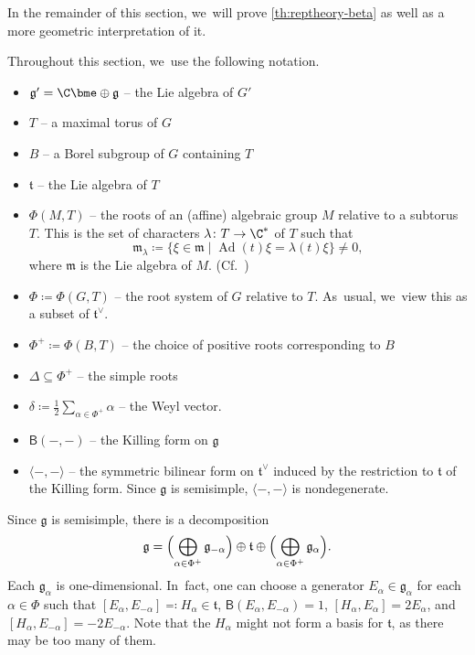 In the remainder of this section, we~will prove \cref{th:reptheory-beta} as well as a more geometric interpretation of it.

\begin{notation}
Throughout this section, we~use the following notation.

\begin{itemize}
\item $\mathfrak{g}'=\C\bme\oplus \mathfrak{g}$ -- the Lie algebra of $G'$
\item $T$ -- a maximal torus of $G$
\item $B$ -- a Borel subgroup of $G$ containing $T$
\item $\mathfrak{t}$ -- the Lie algebra of $T$

\item $\Phi(M,T)$ -- the roots of an (affine) algebraic group $M$ relative to a subtorus $T$. This is the set of characters $\lambda\colon T\to \C^*$ of $T$ such that
\[
\mathfrak{m}_\lambda \coloneqq \{\xi\in \mathfrak{m} \mid \operatorname{Ad}(t)\xi = \lambda(t)\xi\}\neq 0,
\]
where $\mathfrak{m}$ is the Lie algebra of $M$. (Cf.~\cite{Hum75})

\item $\Phi\coloneqq \Phi(G,T)$ -- the root system of $G$ relative to $T$. As~usual, we~view this as a subset of $\mathfrak{t}^\vee$.

\item $\Phi^+\coloneqq \Phi(B,T)$ -- the choice of positive roots corresponding to $B$

\item $\Delta\subseteq \Phi^+$ -- the simple roots

\item $\delta \coloneqq \displaystyle\frac{1}{2}\sum_{\alpha\in \Phi^+}\alpha$ -- the Weyl vector.

\item $\mathsf{B}(-,-)$ -- the Killing form on $\mathfrak{g}$
\item $\langle-,-\rangle$ -- the symmetric bilinear form on $\mathfrak{t}^\vee$ induced by the restriction to $\mathfrak{t}$ of the Killing form. Since $\mathfrak{g}$ is semisimple, $\langle-,-\rangle$ is nondegenerate.
\qedhere
\end{itemize}
\end{notation}

Since $\mathfrak{g}$ is semisimple, there is a decomposition
\[
\mathfrak{g} = \Bigl(\bigoplus_{\alpha\in \Phi^+} \mathfrak{g}_{-\alpha}\Bigr)\oplus \mathfrak{t}\oplus \Bigl(\bigoplus_{\alpha\in \Phi^+} \mathfrak{g}_\alpha\Bigr).
\]
Each $\mathfrak{g}_\alpha$ is one-dimensional. In~fact, one can choose a generator $E_\alpha\in \mathfrak{g}_\alpha$ for each $\alpha\in \Phi$ such that $[E_\alpha,E_{-\alpha}]\eqqcolon H_\alpha\in \mathfrak{t}$, $\mathsf{B}(E_\alpha, E_{-\alpha})=1$, $[H_\alpha, E_\alpha]=2E_\alpha$, and $[H_\alpha, E_{-\alpha}]=-2E_{-\alpha}$. Note that the $H_\alpha$ might not form a basis for $\mathfrak{t}$, as there may be too many of them.

